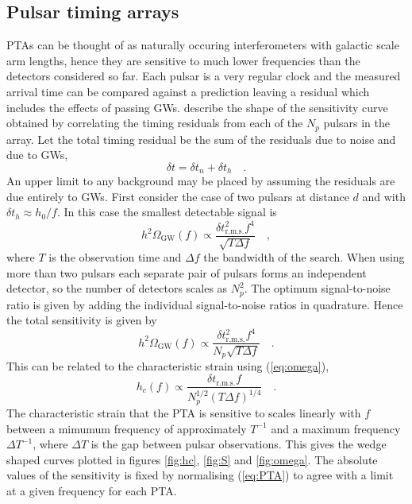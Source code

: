\documentclass[fleqn,12pt]{iopart}
\begin{document}
\subsection{Pulsar timing arrays}
PTAs can be thought of as naturally occuring interferometers with galactic scale arm lengths, hence they are sensitive to much lower frequencies than the detectors considered so far.
Each pulsar is a very regular clock and the measured arrival time can be compared against a prediction leaving a residual which includes the effects of passing GWs. \cite{SesanaVecchioColancino} describe the shape of the sensitivity curve obtained by correlating the timing residuals from each of the $N_{p}$ pulsars in the array. Let the total timing residual be the sum of the residuals due to noise and due to GWs,
\begin{equation} \delta t= \delta t_{n} + \delta t _{h} \quad .\end{equation}
An upper limit to any background may be placed by assuming the residuals are due entirely to GWs. First consider the case of two pulsars at distance $d$ and with $\delta t_{h}\approx h_{0}/f$. In this case the smallest detectable signal is
\begin{equation} h^{2}\Omega_{\textrm{GW}}(f) \propto \frac{\delta t^{2}_{\textrm{r.m.s.}}f^{4}}{\sqrt{T\Delta f}} \quad , \end{equation}
where $T$ is the observation time and $\Delta f$ the bandwidth of the search. When using more than two pulsars each separate pair of pulsars forms an independent detector, so the number of detectors scales as $N_{p}^{2}$. The optimum signal-to-noise ratio is given by adding the individual signal-to-noise ratios in quadrature. Hence the total sensitivity is given by
\begin{equation} h^{2}\Omega_{\textrm{GW}}(f) \propto \frac{\delta t^{2}_{\textrm{r.m.s.}}f^{4}}{N_{p}\sqrt{T\Delta f}} \quad . \end{equation}
This can be related to the characteristic strain using (\ref{eq:omega}),
\begin{equation}\label{eq:PTA} h_{c}(f) \propto \frac{\delta t_{\textrm{r.m.s.}}f}{N_{p}^{1/2}\left( T\Delta f \right)^{1/4}} \quad . \end{equation}
The characteristic strain that the PTA is sensitive to scales linearly with $f$ between a mimumum frequency of approximately $T^{-1}$ and a maximum frequency $\Delta T ^{-1}$, where $\Delta T$ is the gap between pulsar observations. This gives the wedge shaped curves plotted in figures \ref{fig:hc}, \ref{fig:S} and \ref{fig:omega}. The absolute values of the sensitivity is fixed by normalising (\ref{eq:PTA}) to agree with a limit at a given frequency for each PTA.
\end{document}
